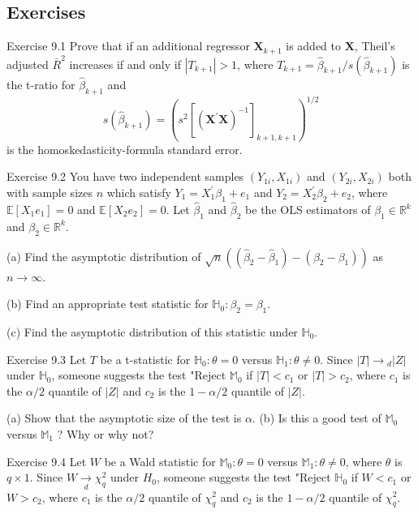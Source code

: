 \documentclass[10pt]{article}
\begin{document}
\subsection{Exercises}
Exercise 9.1 Prove that if an additional regressor $\boldsymbol{X}_{k+1}$ is added to $\boldsymbol{X}$, Theil's adjusted $\bar{R}^{2}$ increases if and only if $\left|T_{k+1}\right|>1$, where $T_{k+1}=\widehat{\beta}_{k+1} / s\left(\widehat{\beta}_{k+1}\right)$ is the t-ratio for $\widehat{\beta}_{k+1}$ and
$$
s\left(\widehat{\beta}_{k+1}\right)=\left(s^{2}\left[\left(\boldsymbol{X}^{\prime} \boldsymbol{X}\right)^{-1}\right]_{k+1, k+1}\right)^{1 / 2}
$$
is the homoskedasticity-formula standard error.

Exercise 9.2 You have two independent samples $\left(Y_{1 i}, X_{1 i}\right)$ and $\left(Y_{2 i}, X_{2 i}\right)$ both with sample sizes $n$ which satisfy $Y_{1}=X_{1}^{\prime} \beta_{1}+e_{1}$ and $Y_{2}=X_{2}^{\prime} \beta_{2}+e_{2}$, where $\mathbb{E}\left[X_{1} e_{1}\right]=0$ and $\mathbb{E}\left[X_{2} e_{2}\right]=0$. Let $\widehat{\beta}_{1}$ and $\widehat{\beta}_{2}$ be the OLS estimators of $\beta_{1} \in \mathbb{R}^{k}$ and $\beta_{2} \in \mathbb{R}^{k}$.

(a) Find the asymptotic distribution of $\sqrt{n}\left(\left(\widehat{\beta}_{2}-\widehat{\beta}_{1}\right)-\left(\beta_{2}-\beta_{1}\right)\right)$ as $n \rightarrow \infty$.

(b) Find an appropriate test statistic for $\mathbb{H}_{0}: \beta_{2}=\beta_{1}$.

(c) Find the asymptotic distribution of this statistic under $\mathbb{H}_{0}$.

Exercise 9.3 Let $T$ be a t-statistic for $\mathbb{H}_{0}: \theta=0$ versus $\mathbb{H}_{1}: \theta \neq 0$. Since $|T| \rightarrow{ }_{d}|Z|$ under $\mathbb{H}_{0}$, someone suggests the test "Reject $\mathbb{M}_{0}$ if $|T|<c_{1}$ or $|T|>c_{2}$, where $c_{1}$ is the $\alpha / 2$ quantile of $|Z|$ and $c_{2}$ is the $1-\alpha / 2$ quantile of $|Z|$.

(a) Show that the asymptotic size of the test is $\alpha$. (b) Is this a good test of $\mathbb{M}_{0}$ versus $\mathbb{M}_{1}$ ? Why or why not?

Exercise 9.4 Let $W$ be a Wald statistic for $\mathbb{M}_{0}: \theta=0$ versus $\mathbb{M}_{1}: \theta \neq 0$, where $\theta$ is $q \times 1$. Since $W \underset{d}{\rightarrow} \chi_{q}^{2}$ under $H_{0}$, someone suggests the test "Reject $\mathbb{H}_{0}$ if $W<c_{1}$ or $W>c_{2}$, where $c_{1}$ is the $\alpha / 2$ quantile of $\chi_{q}^{2}$ and $c_{2}$ is the $1-\alpha / 2$ quantile of $\chi_{q}^{2}$.
\end{document}
